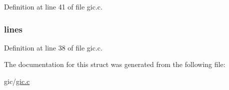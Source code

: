 \-Definition at line 41 of file gic.\-c.

\hypertarget{structgic_af6e49f2b9eca7c6ee734d83fdc035124}{
\subsubsection[{lines}]{ {\bf lines}}}\label{structgic_af6e49f2b9eca7c6ee734d83fdc035124}


\-Definition at line 38 of file gic.\-c.



\-The documentation for this struct was generated from the following file\-:\begin{DoxyCompactItemize}
\item 
gic/\hyperlink{gic_8c}{gic.\-c}\end{DoxyCompactItemize}
